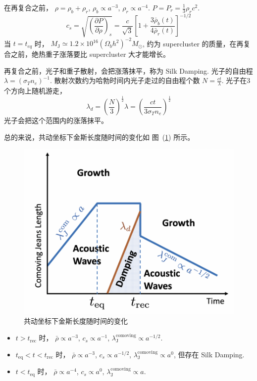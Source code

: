 \documentclass[12pt]{ctexart}
\newcommand{\new}[1]{\textcolor{blue}{#1}}
\newcommand{\reffig}[1]{图~(\ref{#1})}
\begin{document}

在再复合之前， 
$\rho = \rho_b+\rho_r$, $\rho_b\propto a^{-3}$, $\rho_r\propto a^{-4}$. 
$P=P_r=\frac{1}{3}\rho_r c^2$.
\begin{equation}
    c_{s}=\sqrt{\left(\frac{\partial P}{\partial \rho}\right)_{s}}=\frac{c}{\sqrt{3}}\left[1+\frac{3 \bar{\rho}_{b}(t)}{4 \bar{\rho}_{r}(t)}\right]^{-1 / 2}
\end{equation}
当 $t=t_{eq}$ 时，
$M_\text{J} \simeq 1.2\times 10^{16} \left(\Omega_b h^2\right)^{-2} M_\odot$,
约为 supercluster 的质量，在再复合之前，绝热重子涨落要比 supercluster 大才能增长。

再复合之前，光子和重子散射，会把涨落抹平，称为
Silk Damping.
光子的自由程 $\lambda = \left(\sigma_T n_e\right)^{-1}$.
散射次数约为哈勃时间内光子走过的自由程个数 $N=\frac{ct}{\lambda}$.
光子在3个方向上随机游走，
\begin{equation}
    \lambda_d = \left(\frac{N}{3}\right)^{\frac{1}{2}} \lambda = \left(\frac{ct}{3\sigma_T n_e}\right)^{\frac{1}{2}}
\end{equation}
光子会把这个范围内的涨落抹平。

总的来说，共动坐标下金斯长度随时间的变化如 \reffig{Jeans_scale} 所示。
\begin{figure}[!hbtp]
	\centering
	\includegraphics[width=1.0\linewidth]{Jeans_scale.png}
	\caption{共动坐标下金斯长度随时间的变化} \label{Jeans_scale}
\end{figure}

\begin{itemize}
    \item $t>t_\text{rec}$ 时，  $\bar{\rho}\propto a^{-3}$, $c_s\propto a^{-1}$, $\lambda_\text{J}^\text{comoving} \propto a^{-1/2}$.
    \item $t_\text{eq}<t<t_\text{rec}$ 时，  $\bar{\rho}\propto a^{-3}$, $c_s\propto a^{-1/2}$, $\lambda_\text{J}^\text{comoving} \propto a^{0}$, 但存在 Silk Damping.
    \item $t<t_\text{eq}$ 时， $\bar{\rho}\propto a^{-4}$, $c_s\propto a^{0}$, $\lambda_\text{J}^\text{comoving} \propto a$.
\end{itemize}
\end{document}

